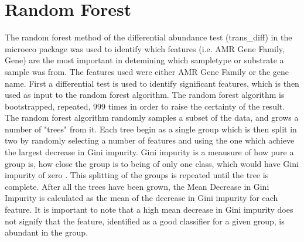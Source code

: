 \section{Random Forest}
The random forest method of the differential abundance test (trans\_diff) in the microeco package \cite{liu2021MicroecoPackageData} was used to identify which features (i.e. AMR Gene Family, Gene) are the most important in detemining which sampletype or substrate a sample was from. 
The features used were either AMR Gene Family or the gene name. 
First a differential test is used to identify significant features, which is then used as input to the random forest algorithm. The random forest algorithm is bootstrapped, repeated, 999 times in order to raise the certainty of the result. 
The random forest algorithm randomly samples a subset of the data, and grows a number of "trees" from it. 
Each tree begin as a single group which is then split in two by randomly selecting a number of features and using the one which achieve the largest decrease in Gini impurity. 
Gini impurity is a meausure of how pure a group is, how close the group is to being of only one class, which would have Gini impurity of zero \cite{ClassificationTreeBinaryDecision}. 
This splitting of the groups is repeated until the tree is complete. 
After all the trees have been grown, the Mean Decrease in Gini Impurity is calculated as the mean of the decrease in Gini impurity for each feature.
It is important to note that a high mean decrease in Gini impurity does not signify that the feature, identified as a good classifier for a given group, is abundant in the group.















